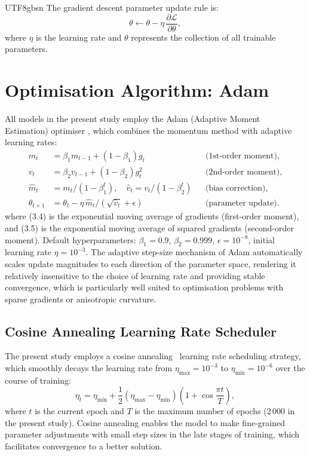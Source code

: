 \documentclass[a4paper,12pt]{report}
\begin{document}
\begin{CJK}{UTF8}{gbsn}
The gradient descent parameter update rule is:
\begin{equation}
  \theta \leftarrow \theta - \eta\,\frac{\partial\mathcal{L}}{\partial\theta},
  \label{eq:gd_update}
\end{equation}
where $\eta$ is the learning rate and $\theta$ represents the collection of all trainable
parameters.

\section{Optimisation Algorithm: Adam}
\label{sec:adam}

All models in the present study employ the Adam (Adaptive Moment Estimation) optimiser
\cite{kingma2015}, which combines the momentum method with adaptive learning rates:
\begin{align}
  m_t &= \beta_1 m_{t-1} + (1-\beta_1)g_t
    && \text{(1st-order moment),} \label{eq:adam1}\\
  v_t &= \beta_2 v_{t-1} + (1-\beta_2)g_t^2
    && \text{(2nd-order moment),} \label{eq:adam2}\\
  \hat{m}_t &= m_t/(1-\beta_1^t),\quad
    \hat{v}_t = v_t/(1-\beta_2^t)
    && \text{(bias correction),} \label{eq:adam3}\\
  \theta_{t+1} &= \theta_t - \eta\,\hat{m}_t/(\sqrt{\hat{v}_t}+\epsilon)
    && \text{(parameter update).} \label{eq:adam4}
\end{align}
where (3.4) is the exponential moving average of gradients (first-order moment),
and (3.5) is the exponential moving average of squared gradients (second-order moment).
Default hyperparameters: $\beta_1 = 0.9$, $\beta_2 = 0.999$, $\epsilon = 10^{-8}$,
initial learning rate $\eta = 10^{-3}$. The adaptive step-size mechanism of Adam
automatically scales update magnitudes to each direction of the parameter space,
rendering it relatively insensitive to the choice of learning rate and providing stable
convergence, which is particularly well suited to optimisation problems with sparse
gradients or anisotropic curvature.

\subsection{Cosine Annealing Learning Rate Scheduler}
\label{subsec:cosine_anneal}

The present study employs a cosine annealing~\cite{loshchilov2017} learning rate
scheduling strategy, which smoothly decays the learning rate from
$\eta_{\max} = 10^{-3}$ to $\eta_{\min} = 10^{-6}$ over the course of training:
\begin{equation}
  \eta_t = \eta_{\min} + \frac{1}{2}(\eta_{\max}-\eta_{\min})
    \left(1 + \cos\frac{\pi t}{T}\right),
  \label{eq:cosine_anneal}
\end{equation}
where $t$ is the current epoch and $T$ is the maximum number of epochs (2\,000 in the
present study). Cosine annealing enables the model to make fine-grained parameter
adjustments with small step sizes in the late stages of training, which facilitates
convergence to a better solution.


\end{CJK}
\end{document}

